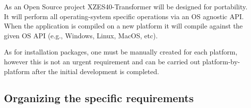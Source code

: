 As an Open Source project XZES40-Transformer will be designed for portability.
It will perform all operating-system specific operations via an OS agnostic API.
When the application is compiled on a new platform it will compile against the given OS API (e.g., Windows, Linux, MacOS, etc).

As for installation packages, one must be manually created for each platform, however this is not an urgent requirement and can be carried out platform-by-platform after the initial development is completed.


\subsection{Organizing the specific requirements}



